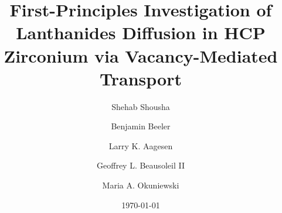 \documentclass[preprint,12pt]{elsarticle}
\title{First-Principles Investigation of Lanthanides Diffusion in HCP Zirconium via Vacancy-Mediated Transport}
\author[inst1]{Shehab Shousha}
\affiliation[inst1]{organization={North Carolina State University},%
            city={Raleigh},
            postcode={27695}, 
            state={NC},
            country={United States}}
\author[inst1,inst2]{Benjamin Beeler}
\affiliation[inst2]{organization={Idaho National Laboratory},%
            city={Idaho Falls},
            postcode={83415}, 
            state={ID},
            country={United States}}
\author[inst2,inst3]{Larry K. Aagesen}
\affiliation[inst3]{organization={Department of Nuclear Engineering and Radiological Sciences, University of Michigan},%
            city={Ann Arbor},
            postcode={48109}, 
            state={MI},
            country={United States}}
\author[inst2]{Geoffrey L. Beausoleil II}
\author[inst4]{Maria A. Okuniewski}
\affiliation[inst4]{organization={Purdue University},%
            city={West Lafayette},
            postcode={47907}, 
            state={IN},
            country={United States}}
\date{\today}
\begin{document}
\begin{abstract}


\end{abstract}
\end{document}
